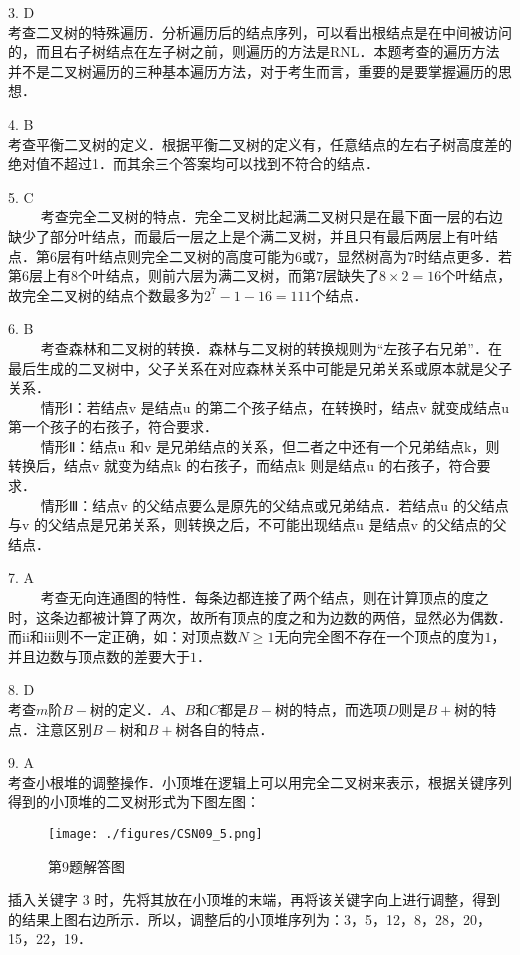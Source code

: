 3. D \\
考查二叉树的特殊遍历．分析遍历后的结点序列，可以看出根结点是在中间被访问的，而且右子树结点在左子树之前，则遍历的方法是RNL．本题考查的遍历方法并不是二叉树遍历的三种基本遍历方法，对于考生而言，重要的是要掌握遍历的思想．

4. B \\
考查平衡二叉树的定义．根据平衡二叉树的定义有，任意结点的左右子树高度差的绝对值不超过1．而其余三个答案均可以找到不符合的结点．

5. C \\
$\qquad$ 考查完全二叉树的特点．完全二叉树比起满二叉树只是在最下面一层的右边缺少了部分叶结点，而最后一层之上是个满二叉树，并且只有最后两层上有叶结点．第$6$层有叶结点则完全二叉树的高度可能为$6$或$7$，显然树高为7时结点更多．若第$6$层上有$8$个叶结点，则前六层为满二叉树，而第7层缺失了$8\times2=16$个叶结点，故完全二叉树的结点个数最多为$2^7-1-16=111$个结点．

6. B \\
$\qquad$ 考查森林和二叉树的转换．森林与二叉树的转换规则为“左孩子右兄弟”．在最后生成的二叉树中，父子关系在对应森林关系中可能是兄弟关系或原本就是父子关系． \\
$\qquad$ 情形Ⅰ：若结点v 是结点u 的第二个孩子结点，在转换时，结点v 就变成结点u 第一个孩子的右孩子，符合要求． \\
$\qquad$ 情形Ⅱ：结点u 和v 是兄弟结点的关系，但二者之中还有一个兄弟结点k，则转换后，结点v 就变为结点k 的右孩子，而结点k 则是结点u 的右孩子，符合要求． \\
$\qquad$ 情形Ⅲ：结点v 的父结点要么是原先的父结点或兄弟结点．若结点u 的父结点与v 的父结点是兄弟关系，则转换之后，不可能出现结点u 是结点v 的父结点的父结点．

7. A \\
$\qquad$ 考查无向连通图的特性．每条边都连接了两个结点，则在计算顶点的度之时，这条边都被计算了两次，故所有顶点的度之和为边数的两倍，显然必为偶数．而ii和iii则不一定正确，如：对顶点数$N\geqslant1$无向完全图不存在一个顶点的度为$1$，并且边数与顶点数的差要大于$1$．

8. D \\
考查$m$阶$B-$树的定义．$A$、$B$和$C$都是$B-$树的特点，而选项$D$则是$B+$树的特点．注意区别$B-$树和$B+$树各自的特点．

9. A \\
考查小根堆的调整操作．小顶堆在逻辑上可以用完全二叉树来表示，根据关键序列得到的小顶堆的二叉树形式为下图左图：
\begin{figure}[ht]
\centering
\texttt{[image: ./figures/CSN09\_5.png]}
\caption{第9题解答图} \label{CSN09_fig5}
\end{figure}
插入关键字 3 时，先将其放在小顶堆的末端，再将该关键字向上进行调整，得到的结果上图右边所示．所以，调整后的小顶堆序列为：3，5，12，8，28，20，15，22，19．


